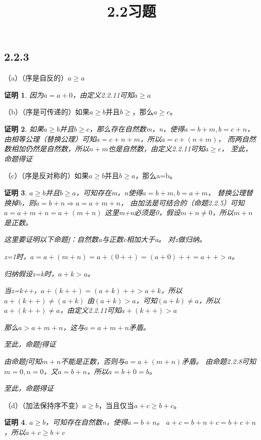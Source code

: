 \documentclass{article}
\theoremstyle{mystyle}
\theoremstyle{zproofstyle}
\newtheorem*{zproof}{证明}
\begin{document}
\title{2.2习题}
\maketitle
\subsection*{2.2.3}

（a）（序是自反的）$a \geq a$

\begin{zproof}
    因为$a = a + 0$，由定义2.2.11可知$a \geq a$
\end{zproof}

（b）（序是可传递的）如果$a \geq b$并且$b \geq $，那么$a \geq c$。

\begin{zproof}
    如果$a \geq b$并且$b \geq c$，那么存在自然数m，n，使得$a = b + m, b = c + n$，
    由相等公理（替换公理）可知$a= c + n + m$，所以$a = c + (n+m)$，
    而两自然数相加仍然是自然数，所以$n+m$也是自然数，由定义2.2.11可知$a \geq c$，
    至此，命题得证
\end{zproof}

（c）（序是反对称的）如果$a \geq b$并且$b \geq a$，那么a=b。

\begin{zproof}
    $a \geq b$并且$b \geq a$，可知存在m，n使得$a=b+m, b=a+m$，
    替换公理替换掉b，则$a=b+n \Rightarrow a=a+m+n$，
    由加法是可结合的（命题2.2.5）可知$a=a+m+n=a+(m+n)$
    这里m+n必须是0，假设$m+n \neq 0$，所以$m+n$是正数。

    这里要证明以下命题f：自然数a与正数c相加大于a。
    对z做归纳。

    z=1时，$a=a+(m+n)=a+(0++)=(a+0)++=a++>a$。

    归纳假设z=k时，$a+k > a$。

    当z=k++，$a+(k++)=(a+k)++>a+k$，所以$a+(k++) \neq (a+k)$
    由$(a+k)>a$，可知$(a+k) \neq a$，所以$a+(k++) \neq a$，由定义2.2.11可知$a+(k++)>a$

    那么$a >  a+m+n$，这与$a=a+m+n $矛盾。

    至此，命题f得证

    由命题f可知$m+n$不能是正数，否则与$a=a+(m+n)$矛盾。
    由命题2.2.8可知$m=0,n=0$，又$a=b+n$，所以$a=b+0=b$。

    至此，命题得证
\end{zproof}

（d）（加法保持序不变）$a \geq b$，当且仅当$a+c \geq b+c$。

\begin{zproof}
    $a \geq b$，可知存在自然数n，使得$a=b+n$。
    $a+c=b+n+c=b+c+n$，所以$a+c \geq b+c$
\end{zproof}
\end{document}
